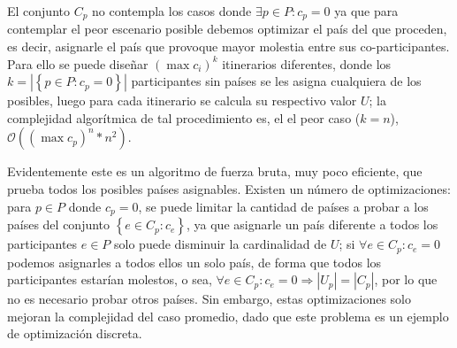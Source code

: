 El conjunto \(C_p\) no contempla los casos donde \(\exists p\in P:c_p=0\) ya que para contemplar el peor escenario posible debemos optimizar el país del que proceden, es decir, asignarle el país que provoque mayor molestia entre sus co-participantes. Para ello se puede dise\~nar \((\max{c_i})^k\) itinerarios diferentes, donde los \(k=\left\vert\left\{p\in P:c_p=0\right\}\right\vert\) participantes sin países se les asigna cualquiera de los posibles, luego para cada itinerario se calcula su respectivo valor \(U\); la complejidad algorítmica de tal procedimiento es, el el peor caso (\(k=n\)), \(\mathcal{O}((\max{c_p})^n*n^2)\).

Evidentemente este es un algoritmo de fuerza bruta, muy poco eficiente, que prueba todos los posibles países asignables. Existen un número de optimizaciones: para \(p\in P\) donde \(c_p=0\), se puede limitar la cantidad de países a probar a los países del conjunto \(\left\{e\in C_p:c_e\right\}\), ya que asignarle un país diferente a todos los participantes \(e\in P\) solo puede disminuir la cardinalidad de \(U\); si \(\forall e\in C_p:c_e=0\) podemos asignarles a todos ellos un solo país, de forma que todos los participantes estarían molestos, o sea, \(\forall e\in C_p:c_e=0\Rightarrow \left\vert U_p\right\vert=\left\vert C_p\right\vert\), por lo que no es necesario probar otros países. Sin embargo, estas optimizaciones solo mejoran la complejidad del caso promedio, dado que este problema es un ejemplo de optimización discreta.
